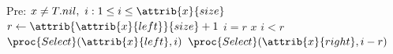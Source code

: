 \begin{codebox}
\zi \Comment Pre: $x \neq T.nil, \ i : 1 \leq i \leq \attrib{x}{size}$
\li $r \gets \attrib{\attrib{x}{left}}{size} + 1$
\li \If $i = r$
\li \Then
        \Return $x$
\li \ElseIf $i < r$
\li	\Then
     	\Return $\proc{Select}(\attrib{x}{left},i)$
\li \ElseNoIf 
\li	     \Return $\proc{Select}(\attrib{x}{right},i-r)$
    \End
\end{codebox}